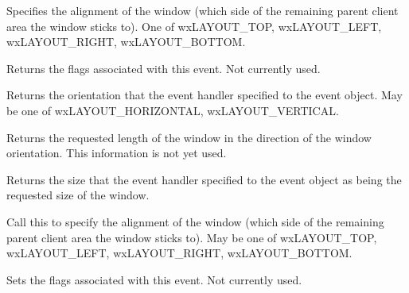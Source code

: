 
Specifies the alignment of the window (which side of the remaining parent client area
the window sticks to). One of wxLAYOUT\_TOP, wxLAYOUT\_LEFT, wxLAYOUT\_RIGHT, wxLAYOUT\_BOTTOM.

\label{wxquerylayoutinfoeventgetflags}


Returns the flags associated with this event. Not currently used.

\label{wxquerylayoutinfoeventgetorientation}


Returns the orientation that the event handler specified to the event object. May be one of wxLAYOUT\_HORIZONTAL,
wxLAYOUT\_VERTICAL.

\label{wxquerylayoutinfoeventgetrequestedlength}


Returns the requested length of the window in the direction of the window orientation. This information
is not yet used.

\label{wxquerylayoutinfoeventgetsize}


Returns the size that the event handler specified to the event object as being the requested size of the window.

\label{wxquerylayoutinfoeventsetalignment}


Call this to specify the alignment of the window (which side of the remaining parent client area
the window sticks to). May be one of wxLAYOUT\_TOP, wxLAYOUT\_LEFT, wxLAYOUT\_RIGHT, wxLAYOUT\_BOTTOM.

\label{wxquerylayoutinfoeventsetflags}


Sets the flags associated with this event. Not currently used.

\label{wxquerylayoutinfoeventsetorientation}

